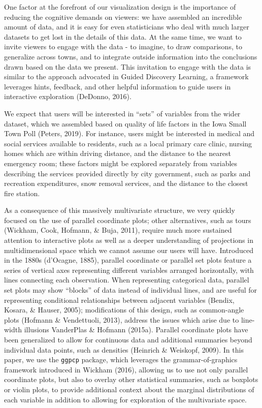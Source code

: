 \documentclass[print]{nuthesis}
\begin{document}
One factor at the forefront of our visualization design is the importance of reducing the cognitive demands on viewers: we have assembled an incredible amount of data, and it is easy for even statisticians who deal with much larger datasets to get lost in the details of this data. At the same time, we want to invite viewers to engage with the data - to imagine, to draw comparisons, to generalize across towns, and to integrate outside information into the conclusions drawn based on the data we present.
This invitation to engage with the data is similar to the approach advocated in Guided Discovery Learning, a framework leverages hints, feedback, and other helpful information to guide users in interactive exploration (DeDonno, 2016).

We expect that users will be interested in ``sets'' of variables from the wider dataset, which we assembled based on quality of life factors in the Iowa Small Town Poll (Peters, 2019). For instance, users might be interested in medical and social services available to residents, such as a local primary care clinic, nursing homes which are within driving distance, and the distance to the nearest emergency room; these factors might be explored separately from variables describing the services provided directly by city government, such as parks and recreation expenditures, snow removal services, and the distance to the closest fire station.

As a consequence of this massively multivariate structure, we very quickly focused on the use of parallel coordinate plots; other alternatives, such as tours (Wickham, Cook, Hofmann, \& Buja, 2011), require much more sustained attention to interactive plots as well as a deeper understanding of projections in multidimensional space which we cannot assume our users will have. Introduced in the 1880s (d'Ocagne, 1885), parallel coordinate or parallel set plots feature a series of vertical axes representing different variables arranged horizontally, with lines connecting each observation. When representing categorical data, parallel set plots may show ``blocks'' of data instead of individual lines, and are useful for representing conditional relationships between adjacent variables (Bendix, Kosara, \& Hauser, 2005); modifications of this design, such as common-angle plots (Hofmann \& Vendettuoli, 2013), address the issues which arise due to line-width illusions VanderPlas \& Hofmann (2015a). Parallel coordinate plots have been generalized to allow for continuous data and additional summaries beyond individual data points, such as densities (Heinrich \& Weiskopf, 2009). In this paper, we use the \texttt{ggpcp} package, which leverages the grammar-of-graphics framework introduced in Wickham (2016), allowing us to use not only parallel coordinate plots, but also to overlay other statistical summaries, such as boxplots or violin plots, to provide additional context about the marginal distributions of each variable in addition to allowing for exploration of the multivariate space.
\end{document}
